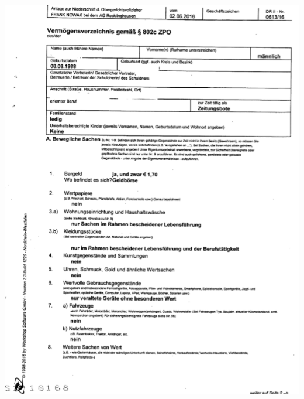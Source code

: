 \label{sec:beispielVermoegensverzeichnisFormular}

\begin{minipage}{\textwidth}
  \centering
  \includegraphics{img/VVformular_teil1.PNG}
\end{minipage}


